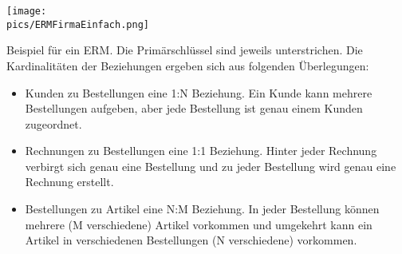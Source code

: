 \begin{minipage}{\textwidth}
	\centering\texttt{[image: \\pics/ERMFirmaEinfach.png]}
\end{minipage}

Beispiel für ein ERM. Die Primärschlüssel sind jeweils unterstrichen. Die Kardinalitäten der Beziehungen ergeben sich aus folgenden Überlegungen:
\begin{itemize}
	\item Kunden zu Bestellungen eine 1:N Beziehung. Ein Kunde kann mehrere Bestellungen aufgeben, aber jede Bestellung ist genau einem Kunden zugeordnet.
	\item Rechnungen zu Bestellungen eine 1:1 Beziehung. Hinter jeder Rechnung verbirgt sich genau eine Bestellung und zu jeder Bestellung wird genau eine Rechnung erstellt.
	\item Bestellungen zu Artikel eine N:M Beziehung. In jeder Bestellung können mehrere (M verschiedene) Artikel vorkommen und umgekehrt kann ein Artikel in verschiedenen Bestellungen (N verschiedene) vorkommen.
\end{itemize}
\begin{Exercise}[title=Vervollständige die ERMs aus Aufgabe \ref{ERMErstellen1}. Jeder Entitätstyp muss einen Primärschlüssel haben und ergänze die Kardinalitäten., label=ERMErstellen2]
	\phantom{ }
\end{Exercise}%
